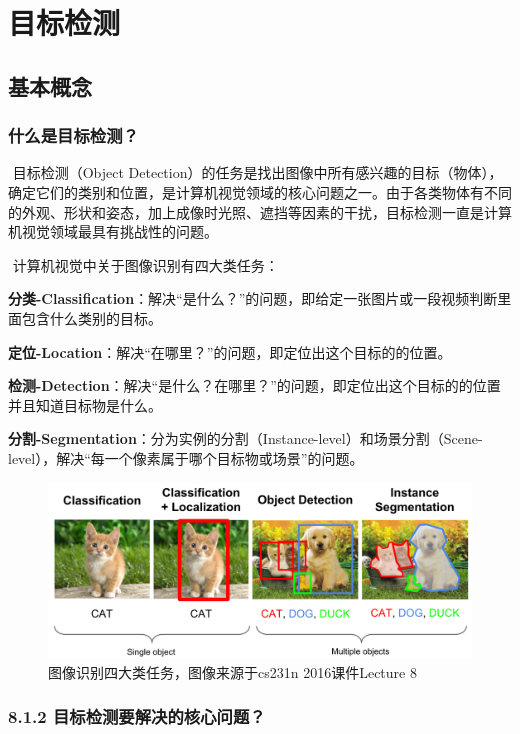 \chapter{目标检测}\label{ux7b2cux516bux7ae0-ux76eeux6807ux68c0ux6d4b}

\section{ 基本概念}\label{ux57faux672cux6982ux5ff5}

\subsection{什么是目标检测？}\label{ux4ec0ux4e48ux662fux76eeux6807ux68c0ux6d4b}

​ 目标检测（Object Detection）的任务是找出图像中所有感兴趣的目标（物体），确定它们的类别和位置，是计算机视觉领域的核心问题之一。由于各类物体有不同的外观、形状和姿态，加上成像时光照、遮挡等因素的干扰，目标检测一直是计算机视觉领域最具有挑战性的问题。

​ 计算机视觉中关于图像识别有四大类任务：

\textbf{分类-Classification}：解决``是什么？''的问题，即给定一张图片或一段视频判断里面包含什么类别的目标。

\textbf{定位-Location}：解决``在哪里？''的问题，即定位出这个目标的的位置。

\textbf{检测-Detection}：解决``是什么？在哪里？''的问题，即定位出这个目标的的位置并且知道目标物是什么。

\textbf{分割-Segmentation}：分为实例的分割（Instance-level）和场景分割（Scene-level），解决``每一个像素属于哪个目标物或场景''的问题。

\begin{figure}
\centering
\includegraphics{./img/ch8/8.1.1.png}
\caption{图像识别四大类任务，图像来源于cs231n 2016课件Lecture 8}
\end{figure}

\subsection{8.1.2
目标检测要解决的核心问题？}\label{ux76eeux6807ux68c0ux6d4bux8981ux89e3ux51b3ux7684ux6838ux5fc3ux95eeux9898}


